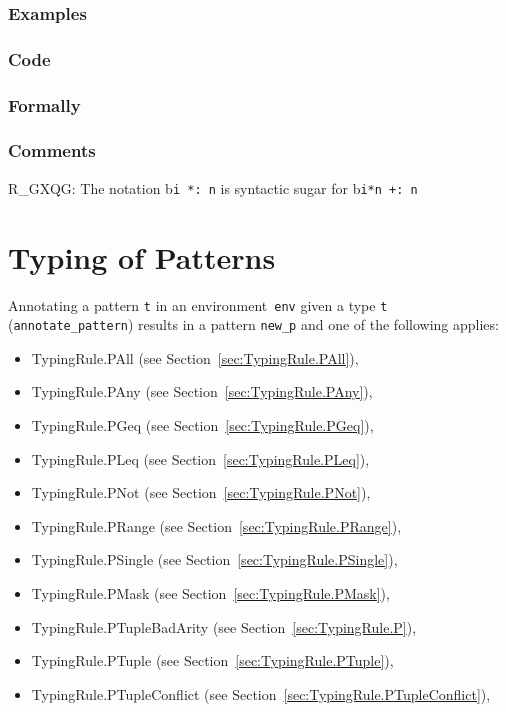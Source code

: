 \documentclass{book}
\begin{document}
  \subsection{Examples}

  \subsection{Code}

  \subsection{Formally}

  \subsection{Comments}
    R\_GXQG: The notation b\texttt{i *: n} is syntactic sugar for b\texttt{i*n +: n}

\chapter{Typing of Patterns}
Annotating a pattern \texttt{t} in an environment~\texttt{env} given a type \texttt{t} (\texttt{annotate\_pattern}) results in a pattern \texttt{new\_p} and one of the following applies:
\begin{itemize}
\item TypingRule.PAll (see Section~\ref{sec:TypingRule.PAll}),
\item TypingRule.PAny (see Section~\ref{sec:TypingRule.PAny}),
\item TypingRule.PGeq (see Section~\ref{sec:TypingRule.PGeq}),
\item TypingRule.PLeq (see Section~\ref{sec:TypingRule.PLeq}),
\item TypingRule.PNot (see Section~\ref{sec:TypingRule.PNot}),
\item TypingRule.PRange (see Section~\ref{sec:TypingRule.PRange}),
\item TypingRule.PSingle (see Section~\ref{sec:TypingRule.PSingle}),
\item TypingRule.PMask (see Section~\ref{sec:TypingRule.PMask}),
\item TypingRule.PTupleBadArity (see Section~\ref{sec:TypingRule.P}),
\item TypingRule.PTuple (see Section~\ref{sec:TypingRule.PTuple}),
\item TypingRule.PTupleConflict (see Section~\ref{sec:TypingRule.PTupleConflict}),
\end{itemize}
\end{document}
